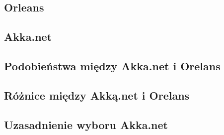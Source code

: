\subsection{Orleans}


\subsection{Akka.net}


\subsection{Podobieństwa między Akka.net i Orelans}


\subsection{Różnice między Akką.net i Orelans}


\subsection{Uzasadnienie wyboru Akka.net}


